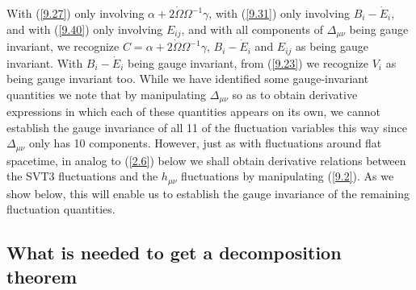 \documentclass[aps,onecolumn,10pt]{revtex4}
\numberwithin{equation}{section}
\numberwithin{equation}{section}
\begin{document}
With (\ref{9.27}) only involving $\alpha +2\dot{\Omega}\Omega^{-1}\gamma$, with (\ref{9.31}) only involving 
$B_i-\dot{E}_i$, and with (\ref{9.40}) only involving $E_{ij}$, and with all components of $\Delta_{\mu\nu}$ being gauge invariant, we recognize $C=\alpha +2\dot{\Omega}\Omega^{-1}\gamma$, $B_i-\dot{E}_i$ and $E_{ij}$ as being gauge invariant. With $B_i-\dot{E}_i$ being gauge invariant, from (\ref{9.23}) we recognize $V_i$ as being gauge invariant too. While we have identified some gauge-invariant quantities we note that by manipulating $\Delta_{\mu\nu}$ so as to obtain derivative expressions in which each of these quantities appears on its own, we cannot establish the gauge invariance of all 11 of the fluctuation variables this way since $\Delta_{\mu\nu}$ only has 10 components. However, just as with fluctuations around flat spacetime, in analog to (\ref{2.6}) below we shall obtain derivative relations between the SVT3 fluctuations and the $h_{\mu\nu}$ fluctuations by manipulating  (\ref{9.2}). As we show below, this will enable us  to establish the gauge invariance of the remaining fluctuation quantities.

\subsection{What is needed to get a decomposition theorem}
\end{document}
